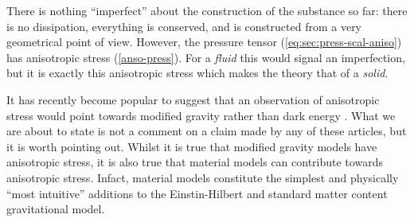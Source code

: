 There is nothing ``imperfect'' about the construction of the substance so far: there is no dissipation,   everything is conserved, and is constructed from a very geometrical point of view. However, the pressure tensor (\ref{eq:sec:press-scal-aniso}) has anisotropic stress (\ref{anso-press}). For a \textit{fluid} this would signal an imperfection, but it is exactly this anisotropic stress which makes the theory  that of a  \textit{solid}.

It has recently become popular to suggest that an observation of anisotropic stress would point towards modified gravity rather than dark energy \cite{Bellini:2014fua, Saltas:2014dha, Amendola:2014wma, Linder:2014fna}. What we are about to state is not a comment on a claim made by any of these articles, but it is worth pointing out. Whilst it is true that modified gravity models have anisotropic stress, it is also true that material models can contribute towards anisotropic stress. Infact, material models constitute the simplest and physically ``most intuitive'' additions to the Einstin-Hilbert and standard matter content gravitational model.

